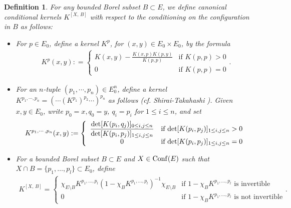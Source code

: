 \documentclass[12pt]{paper}
\newtheorem{definition}[theorem]{Definition}
\numberwithin{theorem}{section}
\numberwithin{figure}{section}
\numberwithin{equation}{section}
\begin{document}
\begin{definition}\label{def-canonical-kernel}
For any bounded Borel subset $B\subset E$, we define canonical conditional kernels $K^{[X, \, B]}$ with respect to the conditioning on the configuration in $B$ as follows:
\begin{itemize}
\item For   $p\in E_0$, define a kernel $K^p$, for  $(x, y)\in E_0 \times E_0$, by the formula
\begin{align*}
K^{p}(x, y): = \left\{  \begin{array}{cc}  K(x, y) - \displaystyle \frac{K(x, p) K(p, y)}{K(p, p)} &  \text{if $K(p, p)> 0$}
\\
 0 &  \text{if $K(p, p)=0$}
 \end{array}.
 \right.
\end{align*}
\item For an $n$-tuple $(p_1, \cdots, p_n) \in E_0^n$,  define a kernel  $K^{p_1, \cdots, p_n} = (\cdots (K^{p_1})^{p_2} \cdots)^{p_n}$ as follows (cf. Shirai-Takahashi \cite[Corollary 6.6]{ST-palm}).
Given $x, y\in E_0$, write $p_0= x, q_0 = y$, $q_i = p_i$ for $1\le i \le n$, and set
 \begin{align}\label{def-Palm-kernel}
 K^{p_1, \cdots, p_n}(x, y) : =
 \left\{  \begin{array}{cl}
 \displaystyle \frac{\mathrm{det}[K(p_i, q_j)]_{0 \le i, j \le n}
}{
 \mathrm{det}[K(p_i, p_j)]_{1\le i, j \le n}
} &  \text{if $\mathrm{det}[K(p_i, p_j)]_{1\le i, j \le n}>0$}
\\
 0 &   \text{if $\mathrm{det}[K(p_i, p_j)]_{1\le i, j \le n} = 0$}
 \end{array}
 \right.
\end{align}
\item For a bounded Borel subset $B\subset E$ and $X \in \mathrm{Conf}(E)$  such that $X\cap B=\{p_1, \dots, p_l\} \subset E_0$,  define
\begin{align}\label{def-cond-kernel}
K^{[X,\, B]}=\left\{
 \begin{array}{cl}
\chi_{E\setminus B} K^{p_1, \dots, p_l}(1-\chi_B K^{p_1, \dots, p_l})^{-1}\chi_{E\setminus B} &  \text{if $1-\chi_B K^{p_1, \dots, p_l}$ is invertible}
\\
0 & \text{if $1-\chi_B K^{p_1, \dots, p_l}$ is not invertible}
 \end{array}.
 \right.
\end{align}
\end{itemize}
\end{definition}
\end{document}
